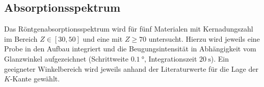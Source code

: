\subsection{Absorptionsspektrum}
Das Röntgenabsorptionsspektrum wird für fünf Materialen mit Kernadungszahl im Bereich $Z \in \left[30, 50 \right]$ und eine
mit $Z \geq 70$ untersucht. Hierzu wird jeweils eine Probe in den Aufbau integriert und die Beugungsintensität in Abhängigkeit
vom Glanzwinkel aufgezeichnet (Schrittweite $\SI{0.1}{\degree}$, Integrationszeit $\SI{20}{\second}$).
Ein geeigneter Winkelbereich wird jeweils anhand der Literaturwerte für die Lage der $K$-Kante gewählt.
